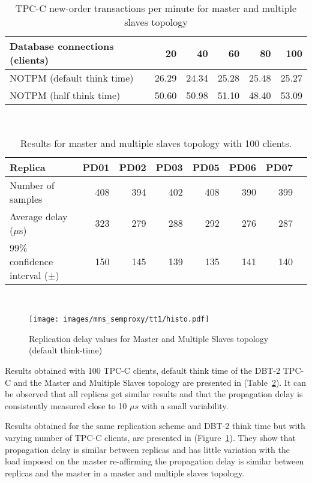 \begin{table}[t]
\centering    
\begin{tabular}{lrrrrr}
 \hline\hline
Database connections (clients) & 20 & 40 & 60 & 80 & 100 \\
\hline
NOTPM (default think time) & 26.29 & 24.34 & 25.28 & 25.48 & 25.27 \\
NOTPM (half think time) & 50.60 & 50.98 & 51.10 & 48.40 & 53.09 \\
\hline
\end{tabular}

~\\
\caption{TPC-C new-order transactions per minute for master and multiple slaves topology}
\label{tab:table_tpcc1}
\end{table}


\begin{table}[t]
\centering    
\begin{tabular}{lrrrrrrr}
 \hline\hline
 Replica & PD01 & PD02 & PD03 & PD05 & PD06 & PD07 \\
\hline
Number of samples & 408 & 394 & 402 & 408 & 390 & 399 \\
Average delay ($\mu$s) & 323 & 279 & 288 & 292 & 276 & 287 \\
99\% confidence interval ($\pm$) & 150 & 145 & 139 & 135 & 141 & 140 \\
\hline
\end{tabular}

~\\
\caption{Results for master and multiple slaves topology with 100 clients.}
\label{tab:table1}
\end{table}


\begin{figure}[t]
\centering    
\texttt{[image: images/mms\_semproxy/tt1/histo.pdf]}
\caption{Replication delay values for Master and Multiple Slaves topology (default think-time)}
\label{fig:mms_tt1}
\end{figure}

Results obtained with 100 TPC-C clients, default think time of the DBT-2 TPC-C and the Master and Multiple Slaves topology are presented in (Table~\ref{tab:table1}). It can be observed that all replicas get similar results and that the propagation delay is consistently measured close to 10 $\mu{}s$ with a small variability. 

Results obtained for the same replication scheme and DBT-2 think time but with varying number of TPC-C clients, are presented in (Figure~\ref{fig:mms_tt1}). They show that propagation delay is similar between replicas and has little variation with the load imposed on the master re-affirming the propagation delay is similar between replicas and the master in a master and multiple slaves topology.


